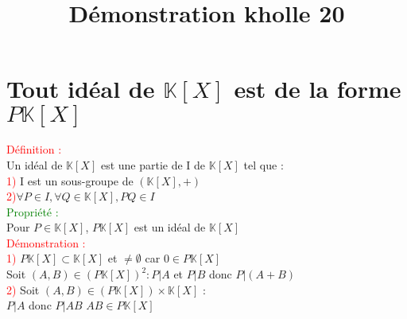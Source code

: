 \documentclass{article}
\begin{document}
\title{Démonstration kholle 20}
\date{}
\maketitle
	\renewcommand{\thesection}{\Roman{section}}
	\setlength{\parindent}{1.5cm}
\section{Tout idéal de $\mathbb K [X]$ est de la forme $P \mathbb K [X]$}
\textcolor{red}{Définition :} \\
Un idéal de $\mathbb{K}[X]$ est une partie de I de $\mathbb K [X]$ tel que : \\
\textcolor{red}{1)} I est un sous-groupe de $(\mathbb K[X],+)$ \\
\textcolor{red}{2)}$\forall P \in I, \forall Q \in \mathbb K[X], PQ \in I$ \\
\textcolor{green}{Propriété :} \\
Pour $P \in \mathbb{K} [X]$, $P \mathbb{K}[X]$ est un idéal de $\mathbb K[X]$ \\
\textcolor{red}{Démonstration :} \\
\textcolor{red}{1)} $P\mathbb{K}[X] \subset \mathbb{K}[X]$ et
$ \neq \emptyset$ car $0 \in P \mathbb{K}[X]$ \\
Soit $(A,B) \in (P \mathbb K [X])^2 : P |A$ et $P|B$ donc $P|(A+B)$ \\
\textcolor{red}{2)} Soit $(A,B) \in (P \mathbb K [X]) \times \mathbb K[X]$ : \\
$P|A$ donc $P|AB$ $AB \in P \mathbb K [X]$
\end{document}
